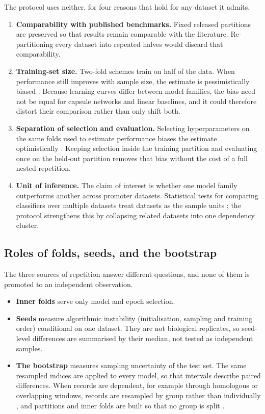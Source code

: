 The protocol uses neither, for four reasons that hold for any dataset it
admits.
\begin{enumerate}
  \item \textbf{Comparability with published benchmarks.} Fixed released
    partitions are preserved so that results remain comparable with the
    literature. Re-partitioning every dataset into repeated halves would
    discard that comparability.
  \item \textbf{Training-set size.} Two-fold schemes train on half of the
    data. When performance still improves with sample size, the estimate is
    pessimistically biased \citep{efron1997improvements}. Because learning
    curves differ between model families, the bias need not be equal for
    capsule networks and linear baselines, and it could therefore distort
    their comparison rather than only shift both.
  \item \textbf{Separation of selection and evaluation.} Selecting
    hyperparameters on the same folds used to estimate performance biases the
    estimate optimistically \citep{varma2006bias}. Keeping selection inside the
    training partition and evaluating once on the held-out partition removes
    that bias without the cost of a full nested repetition.
  \item \textbf{Unit of inference.} The claim of interest is whether one model
    family outperforms another across promoter datasets. Statistical tests for
    comparing classifiers over multiple datasets treat datasets as the sample
    units \citep{demsar2006statistical}; the protocol strengthens this by
    collapsing related datasets into one dependency cluster.
\end{enumerate}

\subsection{Roles of folds, seeds, and the bootstrap}

The three sources of repetition answer different questions, and none of them
is promoted to an independent observation.
\begin{itemize}
  \item \textbf{Inner folds} serve only model and epoch selection.
  \item \textbf{Seeds} measure algorithmic instability (initialisation, sampling
    and training order) conditional on one dataset. They are not biological
    replicates, so seed-level differences are summarised by their median, not
    tested as independent samples.
  \item \textbf{The bootstrap} measures sampling uncertainty of the test set.
    The same resampled indices are applied to every model, so that intervals
    describe paired differences. When records are dependent, for example
    through homologous or overlapping windows, records are resampled by group
    rather than individually \citep{field2007bootstrapping}, and partitions and
    inner folds are built so that no group is split
    \citep{teufel2023graphpart,petti2022benchmark}.
\end{itemize}

